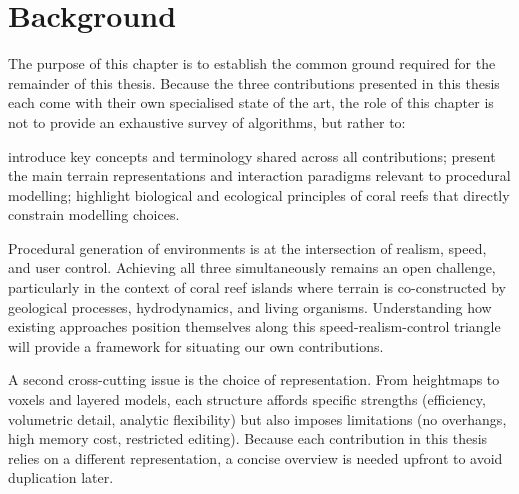 \resetgraphicspath
{}

\chapter{Background}
\label{chap:background}
\minitoc

The purpose of this chapter is to establish the common ground required for the remainder of this thesis. Because the three contributions presented in this thesis each come with their own specialised state of the art, the role of this chapter is not to provide an exhaustive survey of algorithms, but rather to:
\begin{Itemize}
    \Item{} introduce key concepts and terminology shared across all contributions;
    \Item{} present the main terrain representations and interaction paradigms relevant to procedural modelling;
    \Item{} highlight biological and ecological principles of coral reefs that directly constrain modelling choices.
\end{Itemize}





Procedural generation of environments is at the intersection of realism, speed, and user control. Achieving all three simultaneously remains an open challenge, particularly in the context of coral reef islands where terrain is co-constructed by geological processes, hydrodynamics, and living organisms. Understanding how existing approaches position themselves along this speed-realism-control triangle will provide a framework for situating our own contributions.

A second cross-cutting issue is the choice of representation. From heightmaps to voxels and layered models, each structure affords specific strengths (efficiency, volumetric detail, analytic flexibility) but also imposes limitations (no overhangs, high memory cost, restricted editing). Because each contribution in this thesis relies on a different representation, a concise overview is needed upfront to avoid duplication later.

